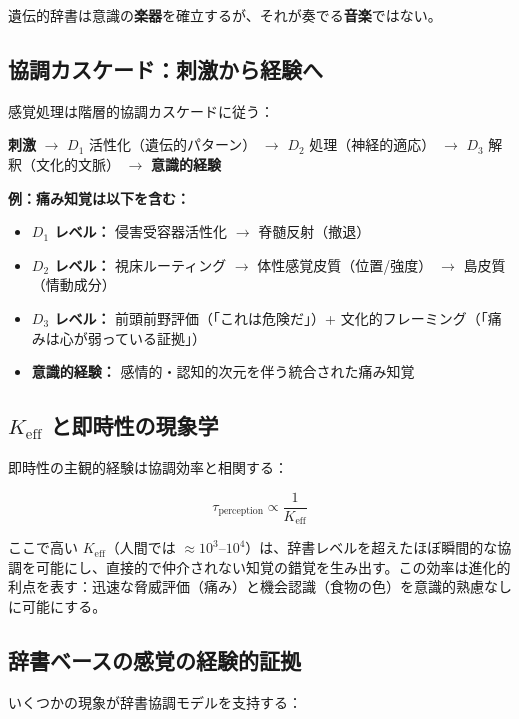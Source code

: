 \documentclass[12pt,a4paper]{article}
\newcommand{\eff}{\mathrm{eff}}
\newcommand{\Ke}{K_{\eff}}
\begin{document}
	遺伝的辞書は意識の\textbf{楽器}を確立するが、それが奏でる\textbf{音楽}ではない。
	
	\subsection{協調カスケード：刺激から経験へ}
	
	感覚処理は階層的協調カスケードに従う：
	
	\begin{center}
		\textbf{刺激} \(\rightarrow\) \(D_1\) 活性化（遺伝的パターン） \(\rightarrow\) \(D_2\) 処理（神経的適応） \(\rightarrow\) \(D_3\) 解釈（文化的文脈） \(\rightarrow\) \textbf{意識的経験}
	\end{center}
	
	\textbf{例：痛み知覚は以下を含む：}
	\begin{itemize}
		\item \textbf{\(D_1\) レベル：} 侵害受容器活性化 \(\rightarrow\) 脊髄反射（撤退）
		\item \textbf{\(D_2\) レベル：} 視床ルーティング \(\rightarrow\) 体性感覚皮質（位置/強度） \(\rightarrow\) 島皮質（情動成分）
		\item \textbf{\(D_3\) レベル：} 前頭前野評価（「これは危険だ」）+ 文化的フレーミング（「痛みは心が弱っている証拠」）
		\item \textbf{意識的経験：} 感情的・認知的次元を伴う統合された痛み知覚
	\end{itemize}
	
	\subsection{\(\Ke\) と即時性の現象学}
	
	即時性の主観的経験は協調効率と相関する：
	
	\[
	\tau_{\text{perception}} \propto \frac{1}{\Ke}
	\]
	
	ここで高い \(\Ke\)（人間では \(\approx 10^3\)--\(10^4\)）は、辞書レベルを超えたほぼ瞬間的な協調を可能にし、直接的で仲介されない知覚の錯覚を生み出す。この効率は進化的利点を表す：迅速な脅威評価（痛み）と機会認識（食物の色）を意識的熟慮なしに可能にする。
	
	\subsection{辞書ベースの感覚の経験的証拠}
	
	いくつかの現象が辞書協調モデルを支持する：
	
\end{document}
